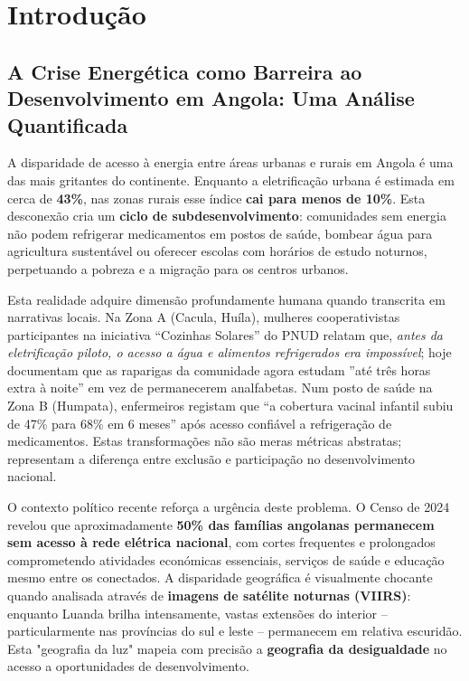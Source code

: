 \documentclass[12pt, a4paper]{article}
\begin{document}
\newpage

\tableofcontents
\newpage

\section{Introdução}

\subsection{A Crise Energética como Barreira ao Desenvolvimento em Angola: Uma Análise Quantificada}

A disparidade de acesso à energia entre áreas urbanas e rurais em Angola é uma das mais gritantes do continente. Enquanto a eletrificação urbana é estimada em cerca de \textbf{43\%}, nas zonas rurais esse índice \textbf{cai para menos de 10\%}. Esta desconexão cria um \textbf{ciclo de subdesenvolvimento}: comunidades sem energia não podem refrigerar medicamentos em postos de saúde, bombear água para agricultura sustentável ou oferecer escolas com horários de estudo noturnos, perpetuando a pobreza e a migração para os centros urbanos.

Esta realidade adquire dimensão profundamente humana quando transcrita em narrativas locais. Na Zona A (Cacula, Huíla), mulheres cooperativistas participantes na iniciativa ``Cozinhas Solares'' do PNUD relatam que, \textit{antes da eletrificação piloto, o acesso a água e alimentos refrigerados era impossível}; hoje documentam que as raparigas da comunidade agora estudam ''até três horas extra à noite'' em vez de permanecerem analfabetas. Num posto de saúde na Zona B (Humpata), enfermeiros registam que ``a cobertura vacinal infantil subiu de 47\% para 68\% em 6 meses'' após acesso confiável a refrigeração de medicamentos. Estas transformações não são meras métricas abstratas; representam a diferença entre exclusão e participação no desenvolvimento nacional.

O contexto político recente reforça a urgência deste problema. O Censo de 2024 revelou que aproximadamente \textbf{50\% das famílias angolanas permanecem sem acesso à rede elétrica nacional}, com cortes frequentes e prolongados comprometendo atividades económicas essenciais, serviços de saúde e educação mesmo entre os conectados. A disparidade geográfica é visualmente chocante quando analisada através de \textbf{imagens de satélite noturnas (VIIRS)}: enquanto Luanda brilha intensamente, vastas extensões do interior – particularmente nas províncias do sul e leste – permanecem em relativa escuridão. Esta "geografia da luz" mapeia com precisão a \textbf{geografia da desigualdade} no acesso a oportunidades de desenvolvimento.
\end{document}
